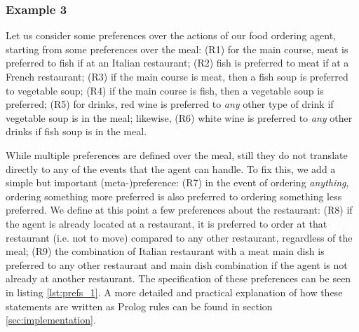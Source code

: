 \subsubsection*{Example 3}
Let us consider some preferences over the actions of our food ordering agent, starting from some preferences over the meal: (R1) for the main course, meat is preferred to fish if at an Italian restaurant; (R2) fish is preferred to meat if at a French restaurant; (R3) if the main course is meat, then a fish soup is preferred to vegetable soup; (R4) if the main course is fish, then a vegetable soup is preferred; (R5) for drinks, red wine is preferred to \textit{any} other type of drink if vegetable soup is in the meal; likewise, (R6) white wine is preferred to \textit{any} other drinks if fish soup is in the meal. 



While multiple preferences are defined over the meal, still they do not translate directly to any of the events that the agent can handle. To fix this, we add a simple but important (meta-)preference: (R7) in the event of ordering \textit{anything}, ordering something more preferred is also preferred to ordering something less preferred.%
We define at this point a few preferences about the restaurant: (R8) if the agent is already located at a restaurant, it is preferred to order at that restaurant (i.e. not to move) compared to {any} other restaurant, regardless of the meal; (R9) the combination of Italian restaurant with a meat main dish is preferred to any other restaurant and main dish combination if the agent is not already at another restaurant. The specification of these preferences can be seen in listing \ref{lst:prefs_1}. A more detailed and practical explanation of how these statements are written as Prolog rules can be found in section \ref{sec:implementation}.

